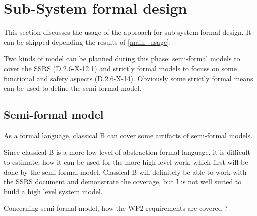 \section{Sub-System formal design}
This section discusses the usage of the approach for sub-system formal design.
It can be skipped depending the results of \ref{main_usage}.

Two kinds of model can be planned during this phase: semi-formal models to  cover the SSRS (D.2.6-X-12.1) and strictly formal  models to  focuss on some functional and safety aspects (D.2.6-X-14).  Obviously some strictly  formal means can be used to define the semi-formal  model.

\subsection{Semi-formal model}


\begin{author_comment}
As a formal language, classical B  can cover some artifacts of semi-formal models.
\end{author_comment}

\begin{assessor2}
Since classical B is a more low level of abstraction formal language, it is difficult to estimate, how it can be used for the more high level work, which first will be done by the semi-formal model. Classical B will definitely be able to work with the SSRS document and demonstrate the coverage, but I is not well suited to build a high level system model.
\end{assessor2}

Concerning semi-formal model, how the WP2 requirements are covered ?

